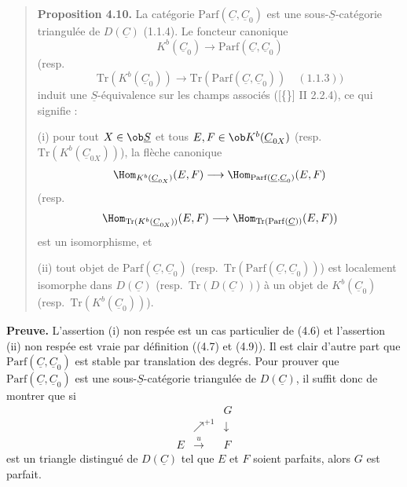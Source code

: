 \begin{quote}
\textbf{Proposition 4.10.} La catégorie $\mathrm{Parf}(\underline{C}, \underline{C}_0)$ est une sous-$\underline{S}$-catégorie triangulée de $D(\underline{C})$ (1.1.4). Le foncteur canonique
\[
K^b(\underline{C}_0) \longrightarrow \mathrm{Parf}(\underline{C}, \underline{C}_0)
\]
(resp.
\[
\mathrm{Tr}(K^b(\underline{C}_0)) \longrightarrow \mathrm{Tr}(\mathrm{Parf}(\underline{C}, \underline{C}_0)) \quad (1.1.3))
\]
induit une $\underline{S}$-équivalence sur les champs associés ([\{\}] II 2.2.4), ce qui signifie :

(i) pour tout $X \in \ob \underline{S}$ et tous $E, F \in \ob K^b(\underline{C}_{0X})$ (resp.\ $\mathrm{Tr}(K^b(\underline{C}_{0X}))$), la flèche canonique
\[
\Hom_{K^b(\underline{C}_{0X})}(E, F) \longrightarrow \Hom_{\mathrm{Parf}(\underline{C}, \underline{C}_0)}(E, F)
\]
(resp.
\[
\Hom_{\mathrm{Tr}(K^b(\underline{C}_{0X}))}(E, F) \longrightarrow \Hom_{\mathrm{Tr}(\mathrm{Parf}(\underline{C}))}(E, F))
\]
est un isomorphisme, et

(ii) tout objet de $\mathrm{Parf}(\underline{C}, \underline{C}_0)$ (resp.\ $\mathrm{Tr}(\mathrm{Parf}(\underline{C}, \underline{C}_0))$) est localement isomorphe dans $D(\underline{C})$ (resp.\ $\mathrm{Tr}(D(\underline{C}))$) à un objet de $K^b(\underline{C}_0)$ (resp.\ $\mathrm{Tr}(K^b(\underline{C}_0))$).
\end{quote}

\textbf{Preuve.} L'assertion (i) non respée est un cas particulier de (4.6) et l'assertion (ii) non respée est vraie par définition ((4.7) et (4.9)). Il est clair d'autre part que $\mathrm{Parf}(\underline{C}, \underline{C}_0)$ est stable par translation des degrés. Pour prouver que $\mathrm{Parf}(\underline{C}, \underline{C}_0)$ est une sous-$\underline{S}$-catégorie triangulée de $D(\underline{C})$, il suffit donc de montrer que si
\[
\begin{array}{ccc}
& & G \\
& \nearrow^{+1} & \downarrow \\
E & \xrightarrow{u} & F
\end{array}
\]
est un triangle distingué de $D(\underline{C})$ tel que $E$ et $F$ soient parfaits, alors $G$ est parfait.

